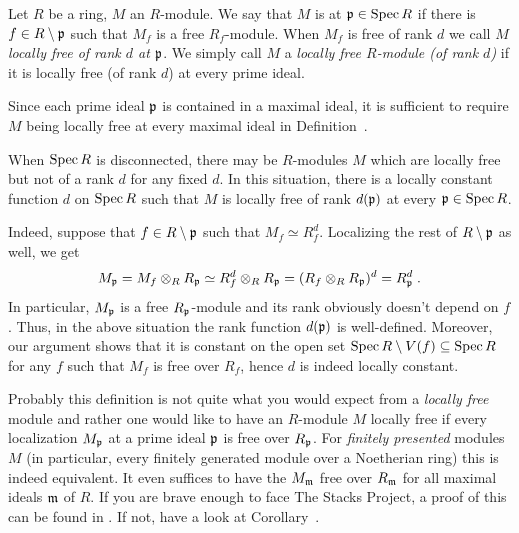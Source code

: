 \documentclass[a4paper,parskip=half,numbers=enddot, DIV=12, headheight=30pt]{scrreprt}
\begin{document}
\begin{defi} 
    Let $R$ be a ring, $M$ an $R$-module. We say that $M$ is  at $\mathfrak{p}\in \operatorname{Spec} R$ if there is $f\in R\setminus\mathfrak{p}$ such that $M_f$ is a free $R_f$-module. When $M_f$ is free of rank $d$ we call $M$ \emph{locally free of rank $d$ at $\mathfrak{p}$}. We simply call $M$ a \emph{locally free $R$-module (of rank $d$)} if it is locally free (of rank $d$) at every prime ideal.
\end{defi}
\begin{rem*}
	\begin{alphanumerate}
		\item Since each prime ideal $\mathfrak{p}$ is contained in a maximal ideal, it is sufficient to require $M$ being locally free at every maximal ideal in Definition~.
		\item When $\operatorname{Spec} R$ is disconnected, there may be $R$-modules $M$ which are locally free but not of a rank $d$ for any fixed $d$. In this situation, there is a locally constant function $d$ on $\operatorname{Spec} R$ such that $M$ is locally free of rank $d(\mathfrak{p})$ at every $\mathfrak{p}\in \operatorname{Spec} R$.
		
		Indeed, suppose that $f\in R\setminus\mathfrak{p}$ such that $M_f\simeq R_f^d$. Localizing the rest of $R\setminus \mathfrak{p}$ as well, we get
		\begin{align*}
			M_{\mathfrak{p}}=M_f\otimes_RR_{\mathfrak{p}}\simeq R_f^d\otimes_R R_{\mathfrak{p}}=(R_f\otimes_RR_{\mathfrak{p}})^d=R_{\mathfrak{p}}^d\;.
		\end{align*}
		In particular, $M_{\mathfrak{p}}$ is a free $R_{\mathfrak{p}}$-module and its rank obviously doesn't depend on $f$. Thus, in the above situation the rank function $d(\mathfrak{p})$ is well-defined. Moreover, our argument shows that it is constant on the open set $\operatorname{Spec} R\setminus V(f)\subseteq \operatorname{Spec} R$ for any $f$ such that $M_f$ is free over $R_f$, hence $d$ is indeed locally constant.
		\item Probably this definition is not quite what you would expect from a \emph{locally free} module and rather one would like to have an $R$-module $M$ locally free if every localization $M_{\mathfrak{p}}$ at a prime ideal $\mathfrak{p}$ is free over $R_{\mathfrak{p}}$. For \emph{finitely presented} modules $M$ (in particular, every finitely generated module over a Noetherian ring) this is indeed equivalent. It even suffices to have the $M_{\mathfrak{m}}$ free over $R_{\mathfrak{m}}$ for all maximal ideals $\mathfrak{m}$ of $R$. If you are brave enough to face The Stacks Project, a proof of this can be found in \cite[Tag 00NX]{stacks-project}. If not, have a look at Corollary~. 
	\end{alphanumerate}
\end{rem*}
\end{document}
